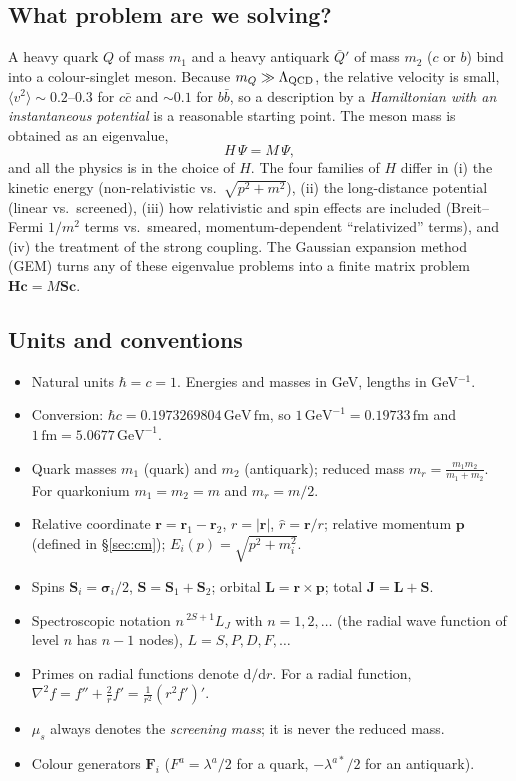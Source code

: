 \documentclass[11pt,a4paper]{article}
\numberwithin{equation}{section}
\theoremstyle{definition}
\theoremstyle{plain}
\theoremstyle{remark}
\numberwithin{algorithm}{section}
\newcommand{\vr}{\bm r}
\newcommand{\vp}{\bm p}
\newcommand{\vL}{\bm L}
\newcommand{\vS}{\bm S}
\newcommand{\vJ}{\bm J}
\newcommand{\vF}{\bm F}
\newcommand{\vsig}{\bm\sigma}
\newcommand{\dd}{\mathrm{d}}
\newcommand{\mr}{m_r}
\newcommand{\mus}{\mu_s}
\newcommand{\expval}[1]{\langle #1\rangle}
\newcommand{\GeV}{\,\mathrm{GeV}}
\newcommand{\fm}{\,\mathrm{fm}}
\newcommand{\mH}{\mathbf H}
\newcommand{\mS}{\mathbf S}
\newcommand{\vc}{\bm c}
\begin{document}
\subsection{What problem are we solving?}
A heavy quark $Q$ of mass $m_1$ and a heavy antiquark $\bar Q'$ of mass $m_2$ ($c$ or $b$) bind into a colour-singlet meson. Because $m_Q\gg\Lambda_{\rm QCD}$, the relative velocity is small,
$\expval{v^2}\sim0.2$--$0.3$ for $c\bar c$ and $\sim0.1$ for $b\bar b$, so a description by a \emph{Hamiltonian with an instantaneous potential} is a reasonable starting point. The meson mass is obtained as an eigenvalue,
\begin{equation}
H\,\Psi=M\,\Psi ,
\end{equation}
and all the physics is in the choice of $H$. The four families of $H$ differ in (i) the kinetic energy (non-relativistic vs.\ $\sqrt{p^2+m^2}$), (ii) the long-distance potential (linear vs.\ screened), (iii) how relativistic and spin effects are included (Breit--Fermi $1/m^2$ terms vs.\ smeared, momentum-dependent ``relativized'' terms), and (iv) the treatment of the strong coupling.
The Gaussian expansion method (GEM) turns any of these eigenvalue problems into a finite matrix problem $\mH\vc=M\mS\vc$.

\subsection{Units and conventions}
\begin{itemize}[leftmargin=1.3em,itemsep=2pt]
\item Natural units $\hbar=c=1$. Energies and masses in GeV, lengths in GeV$^{-1}$.
\item Conversion: $\hbar c=0.1973269804\GeV\fm$, so $1\GeV^{-1}=0.19733\fm$ and $1\fm=5.0677\GeV^{-1}$.
\item Quark masses $m_1$ (quark) and $m_2$ (antiquark); reduced mass $\mr=\frac{m_1m_2}{m_1+m_2}$. For quarkonium $m_1=m_2=m$ and $\mr=m/2$.
\item Relative coordinate $\vr=\vr_1-\vr_2$, $r=|\vr|$, $\hat r=\vr/r$; relative momentum $\vp$ (defined in \S\ref{sec:cm}); $E_i(p)=\sqrt{p^2+m_i^2}$.
\item Spins $\vS_i=\vsig_i/2$, $\vS=\vS_1+\vS_2$; orbital $\vL=\vr\times\vp$; total $\vJ=\vL+\vS$.
\item Spectroscopic notation $n\,{}^{2S+1}L_J$ with $n=1,2,\dots$ (the radial wave function of level $n$ has $n-1$ nodes), $L=S,P,D,F,\dots$
\item Primes on radial functions denote $\dd/\dd r$. For a radial function, $\nabla^2f=f''+\tfrac2rf'=\tfrac1{r^2}(r^2f')'$.
\item $\mus$ always denotes the \emph{screening mass}; it is never the reduced mass.
\item Colour generators $\vF_i$ ($F^a=\lambda^a/2$ for a quark, $-\lambda^{a*}/2$ for an antiquark).
\end{itemize}
\end{document}
